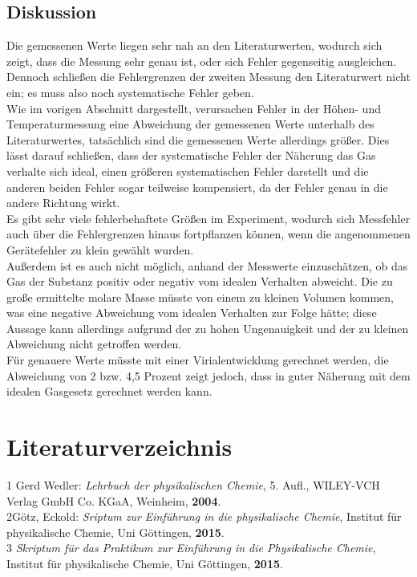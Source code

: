 \documentclass[12pt,a4paper,titlepage,headinclude,bibtotoc]{scrartcl}
\begin{document}
\subsection{Diskussion}


Die gemessenen Werte liegen sehr nah an den Literaturwerten, wodurch sich zeigt, dass die Messung sehr genau ist, oder sich Fehler gegenseitig ausgleichen. Dennoch schließen die Fehlergrenzen der zweiten Messung den Literaturwert nicht ein; es muss also noch systematische Fehler geben. \\
Wie im vorigen Abschnitt dargestellt, verursachen Fehler in der Höhen- und Temperaturmessung eine Abweichung der gemessenen Werte unterhalb des Literaturwertes, tatsächlich sind die gemessenen Werte allerdings größer. Dies lässt darauf schließen, dass der systematische Fehler der Näherung das Gas verhalte sich ideal, einen größeren systematischen Fehler darstellt und die anderen beiden Fehler sogar teilweise kompensiert, da der Fehler genau in die andere Richtung wirkt.\\

Es gibt sehr viele fehlerbehaftete Größen im Experiment, wodurch sich Messfehler auch über die Fehlergrenzen hinaus fortpflanzen können, wenn die angenommenen Gerätefehler zu klein gewählt wurden.\\

 Außerdem ist es auch nicht möglich, anhand der Messwerte einzuschätzen, ob das Gas der Substanz positiv oder negativ vom idealen Verhalten abweicht. Die zu große ermittelte molare Masse müsste von einem zu kleinen Volumen kommen, was eine negative Abweichung vom idealen Verhalten zur Folge hätte; diese Aussage kann allerdings aufgrund der zu hohen Ungenauigkeit und der zu kleinen Abweichung nicht getroffen werden.\\

Für genauere Werte müsste mit einer Virialentwicklung gerechnet werden, die Abweichung von 2 bzw. 4,5 Prozent zeigt jedoch, dass in guter Näherung mit dem idealen Gasgesetz gerechnet werden kann.

\newpage

\section{Literaturverzeichnis}
\begin{flushleft}
1 \quad Gerd Wedler: \emph{Lehrbuch der physikalischen Chemie}, 5. Aufl., WILEY-VCH Verlag GmbH Co. KGaA, Weinheim, \textbf{2004}.\\
\vspace{0,5 cm}
2\quad Götz, Eckold: \emph{Sriptum zur Einführung in die physikalische Chemie}, Institut für physikalische Chemie, Uni Göttingen, \textbf{2015}.\\
\vspace{0,5 cm}
3 \quad \emph{Skriptum für das Praktikum zur Einführung in die Physikalische Chemie}, Institut für physikalische Chemie, Uni Göttingen, \textbf{2015}.\\
\end{flushleft}
\end{document}
